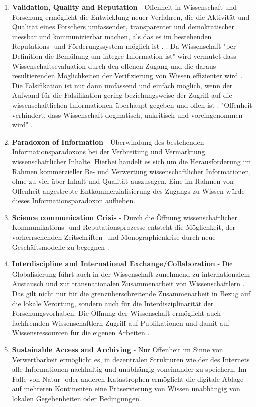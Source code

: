 \begin{enumerate}
\item \textbf{Validation, Quality and Reputation} - Offenheit in Wissenschaft und Forschung ermöglicht die Entwicklung neuer Verfahren, die die Aktivität und Qualität eines Forschers umfassender, transparenter und demokratischer messbar und kommunizierbar machen, als das es im bestehenden Reputations- und Förderungssystem möglich ist \cite{grand_2012_open}. \cite{chalmers_2009_avoidable_waste}. Da Wissenschaft "per Definition die Bemühung um integre Information ist" \cite{umstatter_2007_qualitatssicherung} wird vermutet dass Wissenschaftsevaluation durch den offenen Zugang und die daraus resultierenden Möglichkeiten der Verifizierung von Wissen effizienter wird \cite{Nosek_2015}. Die Falsifikation ist nur dann umfassend und einfach möglich, wenn der Aufwand für die Falsifikation gering beziehungsweise der Zugriff auf die wissenschaftlichen Informationen überhaupt gegeben \cite{umstatter_2007_qualitatssicherung} und offen ist \cite{Peters_2014}. "Offenheit verhindert, dass Wissenschaft dogmatisch, unkritisch und voreingenommen wird" \cite{resnik_2005_ethics}.
\item \textbf{Paradoxon of Information} - Überwindung des bestehenden Informationsparadoxons bei der Verbreitung und Vermarktung wissenschaftlicher Inhalte. Hierbei handelt es sich um die Herausforderung im Rahmen kommerzieller Be- und Verwertung wissenschaftlicher Informationen, ohne zu viel über Inhalt und Qualität auszusagen. Eine im Rahmen von Offenheit angestrebte Entkommerzialisierung des Zugangs zu Wissen würde dieses Informationsparadoxon aufheben.
\item \textbf{Science communication Crisis} - Durch die Öffnung wissenschaftlicher Kommunikations- und Reputationsprozesse entsteht die Möglichkeit, der vorherrschenden Zeitschriften- und Monographienkrise durch neue Geschäftsmodelle zu begegnen \cite{muller_2010_open} \cite{naeder_2010_open}.
\item \textbf{Interdiscipline and International Exchange/Collaboration} - Die Globalisierung führt auch in der Wissenschaft zunehmend zu internationalem Austausch und zur transnationalen Zusammenarbeit von Wissenschaftlern \cite{Waltman_2011}. Das gilt nicht nur für die grenzüberschreitende Zusammenarbeit in Bezug auf die lokale Verortung, sondern auch für die Interdisziplinarität der Forschungsvorhaben. Die Öffnung der Wissenschaft ermöglicht auch fachfremden Wissenschaftlern Zugriff auf Publikationen und damit auf Wissensressourcen für die eigenen Arbeiten \cite{suchen}.
\item \textbf{Sustainable Access and Archiving} - Nur Offenheit im Sinne von Verwertbarkeit ermöglicht es, in dezentralen Strukturen wie der des Internets alle Informationen nachhaltig und unabhängig voneinander zu speichern. Im Falle von Natur- oder anderen Katastrophen ermöglicht die digitale Ablage auf mehreren Kontinenten eine Präservierung von Wissen unabhängig von lokalen Gegebenheiten oder Bedingungen.

\end{enumerate}
